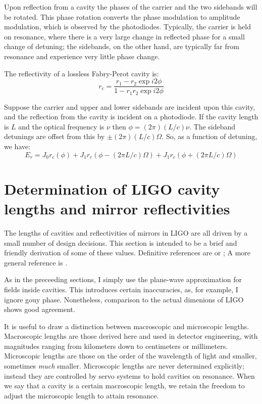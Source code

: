 Upon reflection from a cavity the phases of the carrier and the two
sidebands will be rotated.  This phase rotation converts the phase
modulation to amplitude modulation, which is observed by the
photodiodes.  Typically, the carrier is held on resonance, where there
is a very large change in reflected phase for a small change of
detuning; the sidebands, on the other hand, are typically far from
resonance and experience very little phase change.

The reflectivity of a lossless Fabry-Perot cavity is:
\begin{equation}
r_c = \frac{r_1 - r_2 \exp i2\phi}{1 - r_1 r_2 \exp i 2\phi}
\end{equation}

Suppose the carrier and upper and lower sidebands are incident upon this
cavity, and the reflection from the cavity is incident on a photodiode.
If the cavity length is $L$ and the optical frequency is $\nu$ then
$\phi = (2\pi)(L/c)\nu$.  The sideband detunings are offset from this by
$\pm(2\pi)(L/c)\Omega$.  So, as a function of detuning, we have:
%
\begin{equation}
E_r = J_0 r_c(\phi) 
+ J_1 r_c(\phi - (2\pi L/c)\Omega) 
+ J_1 r_c(\phi + (2\pi L/c)\Omega)
\end{equation}


\section{Determination of LIGO cavity lengths and mirror reflectivities}

The lengths of cavities and reflectivities of mirrors in LIGO are all
driven by a small number of design decisions.  This section is
intended to be a brief and friendly derivation of some of these
values.  Definitive references are \cite{LigoFreqResponse97} or
\cite{Fritschel2001Readout}; A more general reference is
\cite{S5InstrumentPaper}.

As in the preceeding sections, I simply use the plane-wave
approximation for fields inside cavities. This introduces certain
inaccuracies, as, for example, I ignore gouy phase. Nonetheless,
comparison to the actual dimenions of LIGO shows good agreement.

It is useful to draw a distinction between macroscopic and microscopic
lengths. Macroscopic lengths are those derived here and
used in detector engineering, with magnitudes ranging from kilometers
down to centimeters or millimeters. Microscopic lengths are those
on the order of the wavelength of light and smaller, sometimes \emph{much}
smaller. Microscopic lengths are never determined explicitly; instead
they are controlled by servo systems to hold cavities on resonance.
When we say that a cavity is a certain macroscopic length, we retain
the freedom to adjust the microscopic length to attain resonance.

